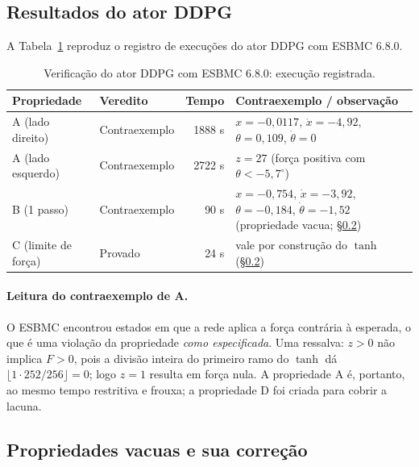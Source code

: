 \documentclass[12pt,openright,oneside,a4paper,chapter=TITLE,sumario=tradicional,english,brazil]{abntex2}
\begin{document}
\subsection{Resultados do ator DDPG}

A Tabela~\ref{tab:ddpg} reproduz o registro de execuções do ator DDPG com ESBMC 6.8.0.

\begin{table}[htb]
\caption{Verificação do ator DDPG com ESBMC 6.8.0: execução registrada.}\label{tab:ddpg}
\centering
\begin{tabular}{l|l|r|p{6.0cm}}
\toprule
\textbf{Propriedade} & \textbf{Veredito} & \textbf{Tempo} & \textbf{Contraexemplo / observação} \\
\midrule
A (lado direito)    & Contraexemplo & 1888 s & $x{=}-0{,}0117$, $\dot x{=}-4{,}92$, $\theta{=}0{,}109$, $\dot\theta{=}0$ \\
A (lado esquerdo)   & Contraexemplo & 2722 s & $z=27$ (força positiva com $\theta<-5{,}7^\circ$) \\
B (1 passo)         & Contraexemplo & 90 s   & $x{=}-0{,}754$, $\dot x{=}-3{,}92$, $\theta{=}-0{,}184$, $\dot\theta{=}-1{,}52$ (propriedade vacua; \S\ref{sec:vac}) \\
C (limite de força) & Provado       & 24 s   & vale por construção do $\tanh$ (\S\ref{sec:vac}) \\
\bottomrule
\end{tabular}
\end{table}

\paragraph{Leitura do contraexemplo de A.} O ESBMC encontrou estados em que a rede aplica a força contrária à esperada, o que é uma violação da propriedade \emph{como especificada}. Uma ressalva: $z>0$ não implica $F>0$, pois a divisão inteira do primeiro ramo do $\tanh$ dá $\lfloor 1\cdot252/256\rfloor=0$; logo $z=1$ resulta em força nula. A propriedade A é, portanto, ao mesmo tempo restritiva e frouxa; a propriedade D foi criada para cobrir a lacuna.

\subsection{Propriedades vacuas e sua correção}\label{sec:vac}
\end{document}
